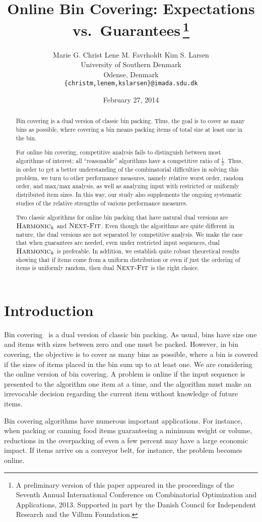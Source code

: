 \documentclass[11pt]{article}
\title{Online Bin Covering: Expectations vs.\ Guarantees\,\thanks{A
preliminary version of this paper appeared in the
proceedings of the Seventh Annual International Conference on
Combinatorial Optimization and Applications, 2013.
Supported in part by the Danish Council for Independent Research
and the Villum Foundation.}}
\author{Marie G. Christ \hspace{2em} Lene M. Favrholdt \hspace{2em} Kim S. Larsen \\[1ex]
        University of Southern Denmark \\
        Odense, Denmark \\[1ex]
        {\tt \{christm,lenem,kslarsen\}@imada.sdu.dk}}
\date{February 27, 2014}
\newcommand{\nextfit}{\ensuremath{\operatorname{\textsc{Next-Fit}}}\xspace}
\newcommand{\harm}{{\ensuremath{\textsc{Harmonic}_k}}\xspace}
\begin{document}
\maketitle

\begin{abstract}
Bin covering is a dual version of classic bin packing.
Thus, the goal is to cover as many bins as possible, where covering a bin
means packing items of total size at least one in the bin.


For online bin covering, competitive analysis fails to distinguish between
most algorithms of interest; 
all ``reasonable'' algorithms have a competitive ratio of $\frac12$.
Thus,
 in order to get a better understanding of the combinatorial difficulties in solving this problem,
 we turn to other
performance measures, namely relative worst order, random order, and
max/max analysis, as well as
analyzing input with restricted or uniformly distributed item sizes.
In this way, our study also supplements the ongoing systematic studies of
the relative strengths of various performance measures.

Two classic algorithms for online bin packing that have natural dual
 versions are \harm and \nextfit. 
Even though the algorithms are quite different in nature, 
the dual versions are
 not separated by competitive analysis.
We make the case that when guarantees are needed, even under restricted
input sequences, dual \harm is preferable. In addition, we
establish quite robust theoretical results showing that if items come
from a uniform distribution or even if just the ordering of items is uniformly
random, then dual \nextfit is the right choice.
\end{abstract}

\section{Introduction}
Bin covering~\cite{AJKL84j} is a dual version of classic bin packing.
As usual, bins have
size one and items with sizes between zero and one must be packed. However,
in bin covering, the objective is to cover as many bins as possible,
where a bin is covered if the sizes of items placed in the bin sum up
to at least one.
We are considering the online version of bin covering. A problem
is online if the input sequence is presented to the algorithm one item
at a time, and the algorithm must make an irrevocable decision regarding
the current item without knowledge of future items.

Bin covering algorithms have numerous important applications.
For instance, when packing or canning food items guaranteeing a
minimum weight or volume, reductions in the overpacking of even a
few percent may have a large economic impact.
If items arrive on a conveyor belt, for instance, the problem becomes online.
\end{document}
